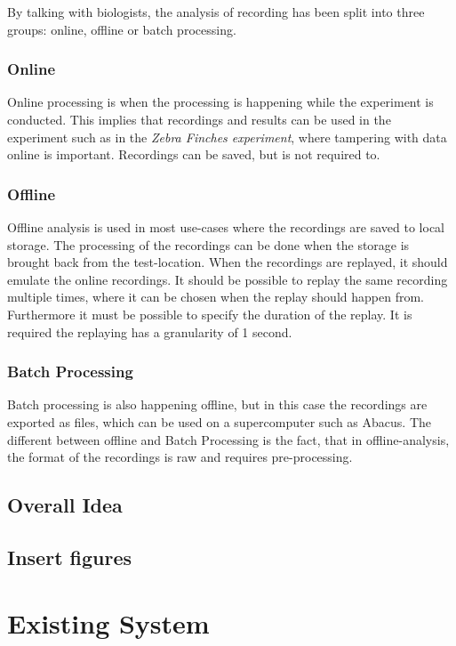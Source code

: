By talking with biologists, the analysis of recording has been split into three groups: online, offline or batch processing.
\subsubsection{Online}\label{sec:usecase:online}
Online processing is when the processing is happening while the experiment is conducted. This implies that recordings and results can be used in the experiment such as in the \textit{Zebra Finches experiment}, where tampering with data online is important. Recordings can be saved, but is not required to.

\subsubsection{Offline}
Offline analysis is used in most use-cases where the recordings are saved to local storage. The processing of the recordings can be done when the storage is brought back from the test-location. When the recordings are replayed, it should emulate the online recordings.
It should be possible to replay the same recording multiple times, where it can be chosen when the replay should happen from. Furthermore it must be possible to specify the duration of the replay. It is required the replaying has a granularity of 1 second.

\subsubsection{Batch Processing}
Batch processing is also happening offline, but in this case the recordings are exported as  files, which can be used on a supercomputer such as Abacus. The different between offline and Batch Processing is the fact, that in offline-analysis, the format of the recordings is raw and requires pre-processing.

\subsection{Overall Idea}
\subsection{Insert figures}


\section{Existing System}

